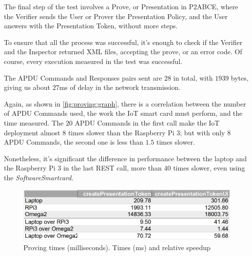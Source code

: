 \documentclass[journal]{IEEEtran}
\begin{document}
The final step of the test involves a Prove, or Presentation in P2ABCE, where the Verifier sends the User or Prover the Presentation Policy, and the User answers with the Presentation Token, without more steps. 

To ensure that all the process was successful, it's enough to check if the Verifier and the Inspector returned XML files, accepting the prove, or an error code. Of course, every execution measured in the test was successful.

The APDU Commands and Responses pairs sent are $28$ in total, with $1939$ bytes, giving us about $27$ms of delay in the network transmission.






Again, as shown in \autoref{fig:proving:graph}, there is a correlation between the number of APDU Commands used, the work the IoT smart card must perform, and the time measured. The $20$ APDU Commands in the first call make the IoT deployment almost $8$ times slower than the Raspberry Pi 3; but with only $8$ APDU Commands, the second one is less than $1.5$ times slower.

Nonetheless, it's significant the difference in performance between the laptop and the Raspberry Pi 3 in the last REST call, more than $40$ times slower, even using the \textit{SoftwareSmartcard}.


\begin{figure}[bth]
	\includegraphics[width=.8\linewidth]{gfx/graphics/provingtable}
	\caption{Proving times (milliseconds). Times (ms) and relative speedup}
	\label{fig:proving:graph}
\end{figure}

\end{document}
